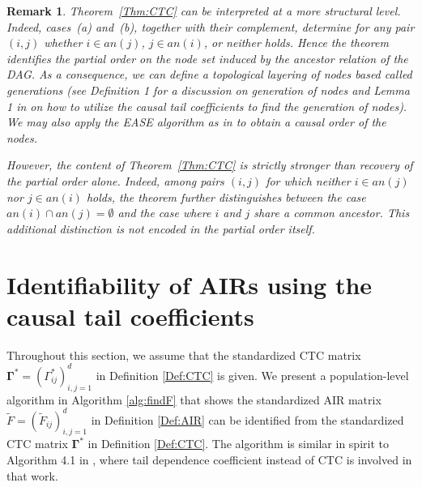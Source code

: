 \documentclass[10pt]{article}
\newtheorem{remark}[theorem]{Remark}
\begin{document}
\begin{remark}
    
Theorem~\ref{Thm:CTC} can be interpreted at a more structural level. 
Indeed, cases~(a) and~(b), together with their complement, determine for any pair $(i,j)$ whether $i \in an(j)$, $j \in an(i)$, or neither holds. Hence the theorem identifies the partial order on the node set induced by the ancestor relation of the DAG. As a consequence, we can define a topological layering of nodes based  called generations (see \cite{kluppelberg2021estimating} Definition 1 for a discussion on generation of nodes and Lemma 1 in \cite{zhou2024efficient} on how to utilize the causal tail coefficients to find the generation of nodes). We may also apply the \textit{EASE} algorithm as in \cite{gnecco2021causal} to obtain a causal order of the nodes.

However, the content of Theorem~\ref{Thm:CTC} is strictly stronger than recovery of the partial order alone. Indeed, among pairs $(i,j)$ for which neither $i \in an(j)$ nor $j \in an(i)$ holds, the theorem further distinguishes between the case $an(i)\cap an(j)=\emptyset$ and the case where $i$ and $j$ share a common ancestor. This additional distinction is not encoded in the partial order itself.
\end{remark} 




\section{Identifiability of AIRs using  the causal tail coefficients}

Throughout this section, we assume that the standardized CTC matrix  $\boldsymbol{\Gamma}^* = (\Gamma^*_{ij})_{i,j=1}^d$ in  Definition \ref{Def:CTC} is given. We present a population-level algorithm in Algorithm \ref{alg:findF}  that shows the standardized AIR matrix $\widetilde{F} = (\widetilde{F}_{ij})_{i,j=1}^d$  in Definition \ref{Def:AIR} can be identified from the standardized CTC  matrix $\boldsymbol{\Gamma}^*$ in Definition \ref{Def:CTC}. The algorithm is similar in spirit  
 to  Algorithm 4.1 in \cite{gissibl2018tail}, where tail dependence coefficient instead of CTC is involved in that work.













\end{document}
